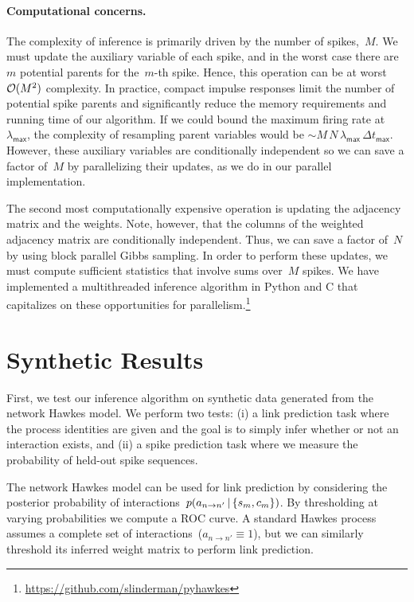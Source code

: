 \paragraph{Computational concerns.}
The complexity of
inference is primarily driven by the number of spikes,~$M$. We must
update the auxiliary variable of each spike, and in the worst case
there are~$m$ potential parents for the~$m$-th spike. Hence, this
operation can be at worst~$\mathcal{O}(M^2)$ complexity.  In practice,
compact impulse responses limit the number of potential spike parents
and significantly reduce the memory requirements and running time of
our algorithm. If we could bound the maximum firing rate at~$\lambda_{\mathsf{max}}$,
the complexity of resampling parent variables would be ${\sim M \, N \, \lambda_{\mathsf{max}} \, \Delta t_{\mathsf{max}}}$. However, these auxiliary
variables are conditionally independent so we can save a factor of~$M$
by parallelizing their updates, as we do in our parallel implementation.

The second most computationally expensive operation is updating the
adjacency matrix and the weights. Note, however, that the columns of
the weighted adjacency matrix are conditionally independent. Thus,
we can save a factor of~$N$ by using block parallel Gibbs sampling.
In order to perform these updates, we must compute sufficient statistics
that involve sums over~$M$ spikes.
We have implemented a multithreaded inference algorithm in Python and
C that capitalizes on these opportunities for
parallelism.\footnote{\url{https://github.com/slinderman/pyhawkes}}


\section{Synthetic Results}
\label{sec:synth}
First, we test our inference algorithm on synthetic data generated
from the network Hawkes model. We perform two tests: (i) a link
prediction task where the process identities are given and the goal is
to simply infer whether or not an interaction exists, and (ii) a spike
prediction task where we measure the probability of held-out spike
sequences.

The network Hawkes model can be used for link prediction by
considering the posterior probability of interactions~${p(a_{n \to
  n'}\,|\, \{s_m,c_m\})}$. By thresholding at varying probabilities we
compute a ROC curve. A standard Hawkes process assumes a complete set
of interactions~($a_{n \to n'}\equiv 1$), but we can similarly threshold
its inferred weight matrix to perform link prediction.

